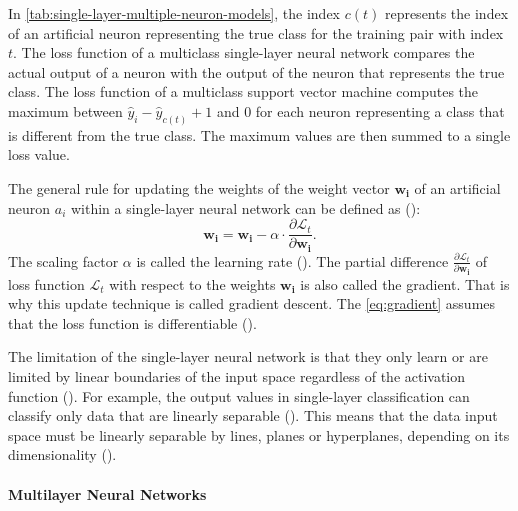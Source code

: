 \documentclass{BachelorBUI}
\begin{document}
                In \autoref{tab:single-layer-multiple-neuron-models}, the index $c(t)$ represents the index of an artificial neuron representing the true class for the training pair with index $t$. The loss function of a multiclass single-layer neural network compares the actual output of a neuron with the output of the neuron that represents the true class. The loss function of a multiclass support vector machine computes the maximum between $\hat{y}_i - \hat{y}_{c(t)} + 1$ and $0$ for each neuron representing a class that is different from the true class. The maximum values are then summed to a single loss value.

                The general rule for updating the weights of the weight vector $\mathbf{w_i}$ of an artificial neuron $a_{i}$ within a single-layer neural network can be defined as (\cite{Aggarwal:2018}):
                \begin{equation}
                    \mathbf{w_i} = \mathbf{w_i} - \alpha \cdot \frac{\partial \mathcal{L}_t}{\partial \mathbf{w_i}}.
                    \label{eq:gradient}
                \end{equation}
                The scaling factor $\alpha$ is called the learning rate (\cite{Aggarwal:2018}). The partial difference $\frac{\partial \mathcal{L}_t}{\partial \mathbf{w_i}}$ of loss function $\mathcal{L}_t$ with respect to the weights $\mathbf{w_i}$ is also called the gradient. That is why this update technique is called gradient descent. The \autoref{eq:gradient} assumes that the loss function is differentiable (\cite{Aggarwal:2018}).

                The limitation of the single-layer neural network is that they only learn or are limited by linear boundaries of the input space regardless of the activation function (\cite{Bishop:2024}). For example, the output values in single-layer classification can classify only data that are linearly separable (\cite{Bishop:2024}). This means that the data input space must be linearly separable by lines, planes or hyperplanes, depending on its dimensionality (\cite{Bishop:2024}).

            \paragraph{Multilayer Neural Networks}
            \label{par:multilayer-neural-networks}
\end{document}
